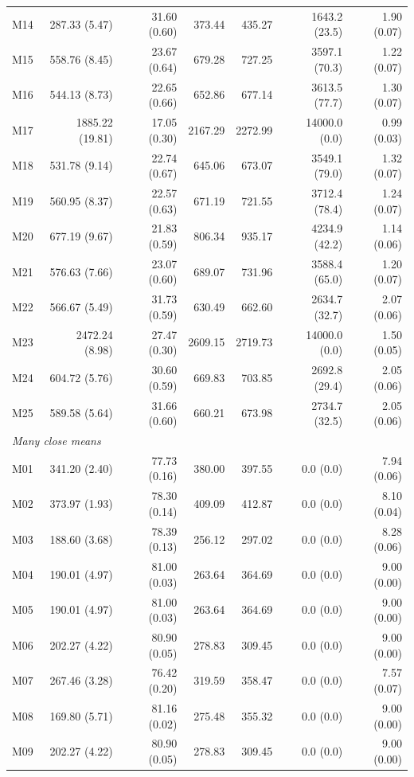 \documentclass[11pt]{article}
\theoremstyle{remark}
\begin{document}
\begin{longtable}{lrrrrrr}
M14 & 287.33 (5.47) & 31.60 (0.60) & 373.44 & 435.27 & 1643.2 (23.5) & 1.90 (0.07) \\
M15 & 558.76 (8.45) & 23.67 (0.64) & 679.28 & 727.25 & 3597.1 (70.3) & 1.22 (0.07) \\
M16 & 544.13 (8.73) & 22.65 (0.66) & 652.86 & 677.14 & 3613.5 (77.7) & 1.30 (0.07) \\
M17 & 1885.22 (19.81) & 17.05 (0.30) & 2167.29 & 2272.99 & 14000.0 (0.0) & 0.99 (0.03) \\
M18 & 531.78 (9.14) & 22.74 (0.67) & 645.06 & 673.07 & 3549.1 (79.0) & 1.32 (0.07) \\
M19 & 560.95 (8.37) & 22.57 (0.63) & 671.19 & 721.55 & 3712.4 (78.4) & 1.24 (0.07) \\
M20 & 677.19 (9.67) & 21.83 (0.59) & 806.34 & 935.17 & 4234.9 (42.2) & 1.14 (0.06) \\
M21 & 576.63 (7.66) & 23.07 (0.60) & 689.07 & 731.96 & 3588.4 (65.0) & 1.20 (0.07) \\
M22 & 566.67 (5.49) & 31.73 (0.59) & 630.49 & 662.60 & 2634.7 (32.7) & 2.07 (0.06) \\
M23 & 2472.24 (8.98) & 27.47 (0.30) & 2609.15 & 2719.73 & 14000.0 (0.0) & 1.50 (0.05) \\
M24 & 604.72 (5.76) & 30.60 (0.59) & 669.83 & 703.85 & 2692.8 (29.4) & 2.05 (0.06) \\
M25 & 589.58 (5.64) & 31.66 (0.60) & 660.21 & 673.98 & 2734.7 (32.5) & 2.05 (0.06) \\
\multicolumn{7}{l}{\textit{Many close means}} \\
M01 & 341.20 (2.40) & 77.73 (0.16) & 380.00 & 397.55 & 0.0 (0.0) & 7.94 (0.06) \\
M02 & 373.97 (1.93) & 78.30 (0.14) & 409.09 & 412.87 & 0.0 (0.0) & 8.10 (0.04) \\
M03 & 188.60 (3.68) & 78.39 (0.13) & 256.12 & 297.02 & 0.0 (0.0) & 8.28 (0.06) \\
M04 & 190.01 (4.97) & 81.00 (0.03) & 263.64 & 364.69 & 0.0 (0.0) & 9.00 (0.00) \\
M05 & 190.01 (4.97) & 81.00 (0.03) & 263.64 & 364.69 & 0.0 (0.0) & 9.00 (0.00) \\
M06 & 202.27 (4.22) & 80.90 (0.05) & 278.83 & 309.45 & 0.0 (0.0) & 9.00 (0.00) \\
M07 & 267.46 (3.28) & 76.42 (0.20) & 319.59 & 358.47 & 0.0 (0.0) & 7.57 (0.07) \\
M08 & 169.80 (5.71) & 81.16 (0.02) & 275.48 & 355.32 & 0.0 (0.0) & 9.00 (0.00) \\
M09 & 202.27 (4.22) & 80.90 (0.05) & 278.83 & 309.45 & 0.0 (0.0) & 9.00 (0.00) \\

\end{longtable}
\end{document}
